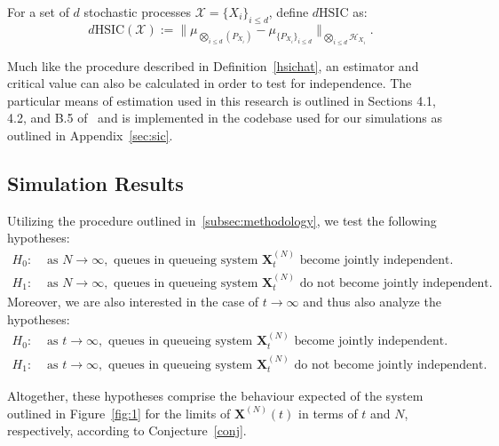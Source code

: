 \begin{definition}[$d$HSIC]

    \label{dhsic}
    For a set of $d$ stochastic processes $\mathcal{X} = \{X_{i}\}_{i \leq d}$, define $d\text{HSIC}$ as:
    \[d\text{HSIC}(\mathcal{X}) := \|\mu_{\bigotimes_{i \leq d}(P_{X_{i}})} - \mu_{\{P_{X_{i}}\}_{i \leq d}}\|_{\bigotimes_{i \leq d}\mathcal{H}_{X_{i}}}.\]
\end{definition}

Much like the procedure described in Definition~\ref{hsichat}, an estimator and critical value can also be calculated in order to test for independence.
The particular means of estimation used in this research is outlined in Sections 4.1, 4.2, and B.5 of~\cite{jointindep} and is
implemented in the codebase used for our simulations as outlined in Appendix~\ref{sec:sic}.

\subsection{Simulation Results}\label{subsec:simulation-results}
Utilizing the procedure outlined in~\ref{subsec:methodology}, we test the following hypotheses:
\begin{align*}
    \label{set 2}
    H_{0}:& \text{ as } N\rightarrow \infty, \text{ queues in queueing system } \mathbf{X}_{t}^{(N)} \text{ become jointly independent.}  \\
    H_{1}:& \text{ as } N\rightarrow \infty, \text{ queues in queueing system } \mathbf{X}_{t}^{(N)} \text{ do not become jointly independent.}
\end{align*}
Moreover, we are also interested in the case of $t \rightarrow \infty$ and thus also analyze the hypotheses:
\begin{align*}
    \label{set 1}
    H_{0}:& \text{ as } t\rightarrow \infty, \text{ queues in queueing system } \mathbf{X}_{t}^{(N)} \text{ become jointly independent.}  \\
    H_{1}:& \text{ as } t\rightarrow \infty, \text{ queues in queueing system } \mathbf{X}_{t}^{(N)} \text{ do not become jointly independent.}
\end{align*}

Altogether, these hypotheses comprise the behaviour expected of the system outlined in Figure~\ref{fig:1} for the limits of $\mathbf{X}^{(N)}(t)$
in terms of $t$ and $N$, respectively, according to Conjecture~\ref{conj}.


